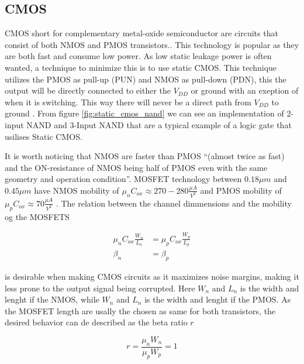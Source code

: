 \subsection{CMOS}
CMOS short for complementary metal-oxide semiconductor are circuits that consist of both NMOS and PMOS transistors.\cite[p. 14]{carusone_2012_analog}. This technology is popular as they are both fast and consume low power. As low static leakage power is often wanted, a technique to minimize this is to use static CMOS. This technique utilizes the PMOS as pull-up (PUN) and NMOS as pull-down (PDN), this the output will be directly connected to either the $V_{DD}$ or ground with an exeption of when it is switching. This way there will never be a direct path from $V_{DD}$ to ground \cite{a2018}. From figure \ref{fig:static_cmos_nand} we can see an implementation of 2-input NAND and 3-Input NAND that are a typical example of a logic gate that usilises Static CMOS.


It is worth noticing that NMOS are faster than PMOS ``(almost twice as fast) and the ON-resistance of NMOS being half of PMOS even with the same geometry and operation condition''\cite{kusumitha_2019_why}. MOSFET technology between $0.18\mu m$ and $0.45\mu m$ have NMOS mobility of $\mu_nC_{ox}\approx 270-280 \frac{\mu A}{V^2}$ and PMOS mobility of $\mu_pC_{ox}\approx 70 \frac{\mu A}{V^2}$ \cite{carusone_2012_analog}. The relation between the channel dimmensions and the mobility og the MOSFETS

\begin{align}
    \mu_nC_{ox}\frac{W_n}{L_n}&=\mu_pC_{ox}\frac{W_p}{L_p}\\
    \beta_n&=\beta_p
    \label{eq:beta_ratio}
\end{align}

is desirable when making CMOS circuits as it maximizes noise margins, making it less prone to the output signal being corrupted. Here $W_n$ and $L_n$ is the width and lenght if the NMOS, while $W_n$ and $L_n$ is the width and lenght if the PMOS. As the MOSFET length are usally the chosen as same for both transistors, the desired behavior can de described as the beta ratio $r$ \cite[p. 90]{neilheweste_2015_cmos}

\begin{equation}
    r=\frac{\mu_n W_n}{\mu_p W_p}=1
    \label{eq:betaratio}
\end{equation}

